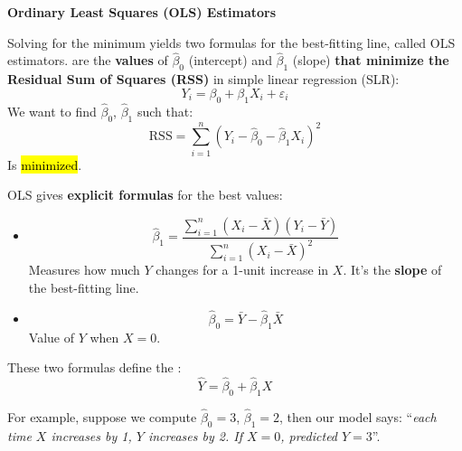 \newpage

\begin{flushleft}
    \textcolor{Green3}{ \textbf{Ordinary Least Squares (OLS) Estimators}}
\end{flushleft}
Solving for the minimum yields two formulas for the best-fitting line, called OLS estimators.  are the \textbf{values} of $\hat{\beta}_{0}$ (intercept) and $\hat{\beta}_{1}$ (slope) \textbf{that minimize the Residual Sum of Squares (RSS)} in simple linear regression (SLR):
\begin{equation*}
    Y_i = \beta_0 + \beta_1 X_i + \varepsilon_i
\end{equation*}
We want to find $\hat{\beta}_{0}$, $\hat{\beta}_{1}$ such that:
\begin{equation*}
    \text{RSS} = \displaystyle\sum_{i=1}^{n} (Y_i - \hat{\beta}_0 - \hat{\beta}_1 X_i)^{2}
\end{equation*}
Is \hl{minimized}.

\highspace
OLS gives \textbf{explicit formulas} for the best values:
\begin{itemize}
    \item {}
    \begin{equation}
        \hat{\beta}_1 = \dfrac{
            \displaystyle\sum_{i=1}^{n}\left(X_{i} - \bar{X}\right)\left(Y_i - \bar{Y}\right)
        }{
            \displaystyle\sum_{i=1}^{n}\left(X_{i} - \bar{X}\right)^{2}
        }
    \end{equation}
    Measures how much $Y$ changes for a 1-unit increase in $X$. It's the \textbf{slope} of the best-fitting line.

    \item {}
    \begin{equation}
        \hat{\beta}_0 = \bar{Y} - \hat{\beta}_1 \bar{X}
    \end{equation}
    Value of $Y$ when $X = 0$.
\end{itemize}
These two formulas define the :
\begin{equation}
    \hat{Y} = \hat{\beta}_0 + \hat{\beta}_1 X
\end{equation}

\highspace
For example, suppose we compute $\hat{\beta}_{0} = 3$, $\hat{\beta}_{1} = 2$, then our model says: ``\emph{each time $X$ increases by 1, $Y$ increases by 2. If $X=0$, predicted $Y=3$}''.